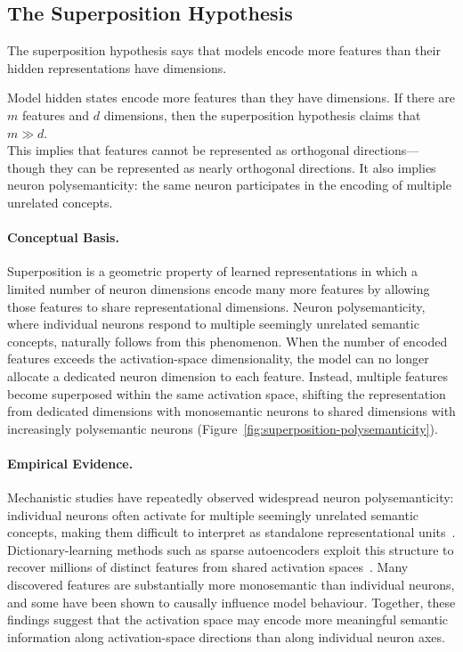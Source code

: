 \subsection{The Superposition Hypothesis}
\label{subsec:superposition}

The superposition hypothesis says that models encode more features than their hidden representations have dimensions.

\begin{definitionbox}
Model hidden states encode more features than they have dimensions. If there are $m$ features and 
$d$ dimensions, then the superposition hypothesis claims that $m \gg d$.\\

This implies that features cannot be represented as orthogonal directions---though they can be represented as nearly orthogonal directions. It also implies neuron polysemanticity: the same neuron participates in the encoding of multiple unrelated concepts.
\end{definitionbox}

\paragraph{Conceptual Basis.}

Superposition is a geometric property of learned representations in which a limited number of neuron dimensions encode many more features by allowing those features to share representational dimensions. Neuron polysemanticity, where individual neurons respond to multiple seemingly unrelated semantic concepts, naturally follows from this phenomenon. When the number of encoded features exceeds the activation-space dimensionality, the model can no longer allocate a dedicated neuron dimension to each feature. Instead, multiple features become superposed within the same activation space, shifting the representation from dedicated dimensions with monosemantic neurons to shared dimensions with increasingly polysemantic neurons (Figure~\ref{fig:superposition-polysemanticity}).

\paragraph{Empirical Evidence.}
Mechanistic studies have repeatedly observed widespread neuron polysemanticity: individual neurons often activate for multiple seemingly unrelated semantic concepts, making them difficult to interpret as standalone representational units~. Dictionary-learning methods such as sparse autoencoders exploit this structure to recover millions of distinct features from shared activation spaces~. Many discovered features are substantially more monosemantic than individual neurons, and some have been shown to causally influence model behaviour. Together, these findings suggest that the activation space may encode more meaningful semantic information along activation-space directions than along individual neuron axes.

